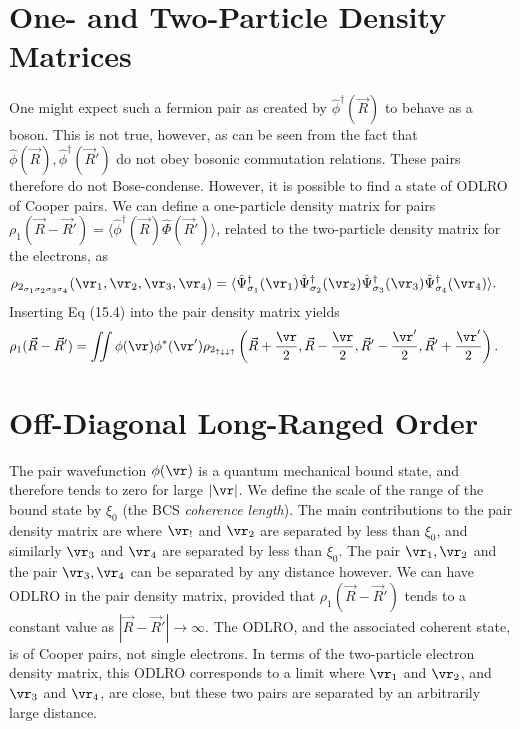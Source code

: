 \documentclass[a4paper, 11pt, normalem]{report}
\begin{document}
\section{One- and Two-Particle Density Matrices}
One might expect such a fermion pair as created by $\hat{\phi}^\dagger(\vec{R})$ to behave as a boson.
This is not true, however, as can be seen from the fact that $\hat{\phi}(\vec{R}),\hat{\phi}^\dagger(\vec{R}')$ do not obey bosonic commutation relations.
These pairs therefore do not Bose-condense.
However, it is possible to find a state of ODLRO of Cooper pairs.
We can define a one-particle density matrix for pairs $\rho_1(\vec{R}-\vec{R}')=\langle\hat{\phi}^\dagger(\vec{R})\hat{\Phi}(\vec{R}')\rangle$, related to the two-particle density matrix for the electrons, as
\begin{align}
    \rho_{2_{\sigma_1\sigma_2\sigma_3\sigma_4}}(\vr_1,\vr_2,\vr_3,\vr_4) &= \langle\hat{\Psi}_{\sigma_1}^\dagger(\vr_1)\hat{\Psi}_{\sigma_2}^\dagger(\vr_2)\hat{\Psi}_{\sigma_3}^\dagger(\vr_3)\hat{\Psi}_{\sigma_4}^\dagger(\vr_4)\rangle.
\end{align}
Inserting Eq (15.4) into the pair density matrix yields
\begin{align}
    \rho_1(\vec{R}-\vec{R}') &= \iint \phi(\vr)\phi^*(\vr')\rho_{2_{\uparrow\downarrow\downarrow\uparrow}}\left(\vec{R}+\frac{\vr}{2},\vec{R}-\frac{\vr}{2},\vec{R}'-\frac{\vr'}{2},\vec{R}'+\frac{\vr'}{2}\right).
\end{align}

\newpage
\section{Off-Diagonal Long-Ranged Order}
The pair wavefunction $\phi(\vr)$ is a quantum mechanical bound state, and therefore tends to zero for large $|\vr|$.
We define the scale of the range of the bound state by $\xi_0$ (the BCS \emph{coherence length}).
The main contributions to the pair density matrix are where $\vr_!$ and $\vr_2$ are separated by less than $\xi_0$, and similarly $\vr_3$ and $\vr_4$ are separated by less than $\xi_0$.
The pair $\vr_1,\vr_2$ and the pair $\vr_3,\vr_4$ can be separated by any distance however.
We can have ODLRO in the pair density matrix, provided that $\rho_1(\vec{R}-\vec{R}')$ tends to a constant value as $|\vec{R}-\vec{R}'|\to\infty$.
The ODLRO, and the associated coherent state, is of Cooper pairs, not single electrons.
In terms of the two-particle electron density matrix, this ODLRO corresponds to a limit where $\vr_1$ and $\vr_2$, and $\vr_3$ and $\vr_4$, are close, but these two pairs are separated by an arbitrarily large distance.
\end{document}

